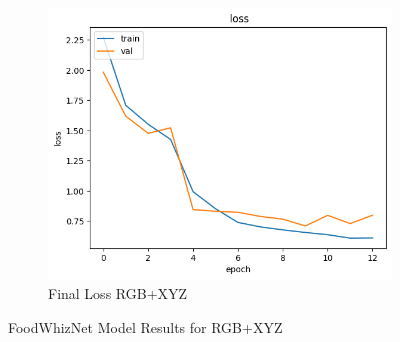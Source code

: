 \begin{figure}[htbp]
\begin{subfigure}[b]{0.45\textwidth}
  \end{subfigure}
  \medskip
  \begin{subfigure}[b]{0.45\textwidth}
    \includegraphics[width=\textwidth]{graphics/images/results/v2-loss-rgbxyz.png}
    \caption{Final Loss RGB+XYZ}
    \label{fig:v2-loss-rgbxyz}
  \end{subfigure}
  \caption{FoodWhizNet Model Results for RGB+XYZ}
  \label{fig:fwnresultsrgbxyz}
\end{figure}